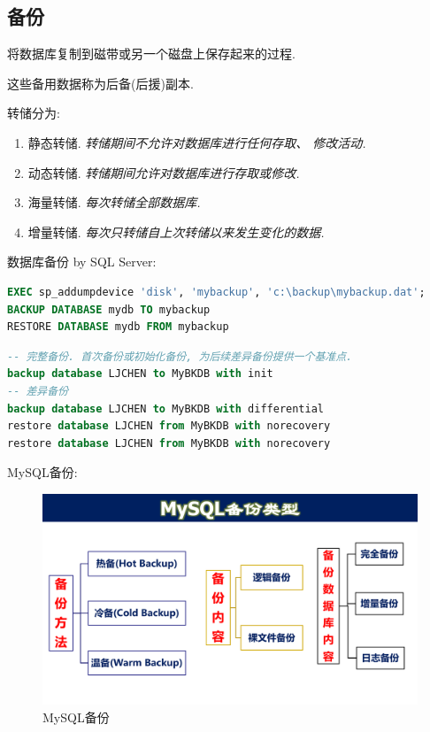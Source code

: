 \subsection{备份}

\begin{definition}[转储]
将数据库复制到磁带或另一个磁盘上保存起来的过程.

这些备用数据称为后备(后援)副本.
\end{definition}

转储分为:
\begin{enumerate}
    \item 静态转储. \textit{转储期间不允许对数据库进行任何存取、 修改活动.}
    \item 动态转储. \textit{转储期间允许对数据库进行存取或修改.}
    \item 海量转储. \textit{每次转储全部数据库.}
    \item 增量转储. \textit{每次只转储自上次转储以来发生变化的数据.}
\end{enumerate}

数据库备份 by SQL Server:
\begin{lstlisting}[language=sql]
EXEC sp_addumpdevice 'disk', 'mybackup', 'c:\backup\mybackup.dat';
BACKUP DATABASE mydb TO mybackup
RESTORE DATABASE mydb FROM mybackup
\end{lstlisting}

\begin{lstlisting}[language=sql]
-- 完整备份. 首次备份或初始化备份, 为后续差异备份提供一个基准点.
backup database LJCHEN to MyBKDB with init
-- 差异备份
backup database LJCHEN to MyBKDB with differential
restore database LJCHEN from MyBKDB with norecovery
restore database LJCHEN from MyBKDB with norecovery
\end{lstlisting}

MySQL备份:
\begin{figure}[H]
    \centering
    \includegraphics[width=.8\textwidth]{./figure/MySQL备份.pdf}
    \caption{MySQL备份}
\end{figure}

